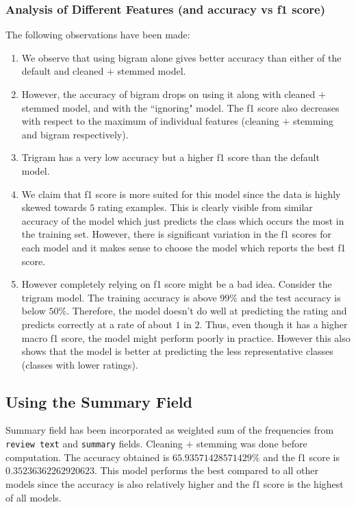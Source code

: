 \documentclass[11pt]{article}
\begin{document}
\subsubsection{Analysis of Different Features (and accuracy vs f1 score)}
The following observations have been made:
\begin{enumerate}
  \item We observe that using bigram alone gives better accuracy than either of the default and cleaned $+$ stemmed model.
  \item However, the accuracy of bigram drops on using it along with cleaned $+$ stemmed model, and with the ``ignoring" model. The f1 score also decreases with respect to the maximum of individual features (cleaning $+$ stemming and bigram respectively).
  \item Trigram has a very low accuracy but a higher f1 score than the default model.
  \item We claim that f1 score is more suited for this model since the data is highly skewed towards $5$ rating examples. This is clearly visible from similar accuracy of the model which just predicts the class which occurs the most in the training set. However, there is significant variation in the f1 scores for each model and it makes sense to choose the model which reports the best f1 score.
  \item However completely relying on f1 score might be a bad idea. Consider the trigram model. The training accuracy is above $99\%$ and the test accuracy is below $50\%$. Therefore, the model doesn't do well at predicting the rating and predicts correctly at a rate of about $1$ in $2$. Thus, even though it has a higher macro f1 score, the model might perform poorly in practice. However this also shows that the model is better at predicting the less representative classes (classes with lower ratings).
\end{enumerate}

\subsection{Using the Summary Field}
Summary field has been incorporated as weighted sum of the frequencies from \texttt{review text} and \texttt{summary} fields. Cleaning $+$ stemming was done before computation. The accuracy obtained is $65.93571428571429\%$ and the f1 score is $0.35236362262920623$. This model performs the best compared to all other models since the accuracy is also relatively higher and the f1 score is the highest of all models.
\end{document}
